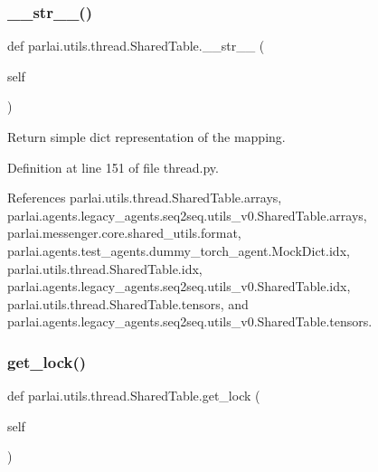 \mbox{\label{classparlai_1_1utils_1_1thread_1_1SharedTable_aa18f723bbdfce0ab50d9c36b20cec2c7}} 
\subsubsection{\texorpdfstring{\+\_\+\+\_\+str\+\_\+\+\_\+()}{\_\_str\_\_()}}
{\footnotesize\ttfamily def parlai.\+utils.\+thread.\+Shared\+Table.\+\_\+\+\_\+str\+\_\+\+\_\+ (\begin{DoxyParamCaption}\item[{}]{self }\end{DoxyParamCaption})}

\begin{DoxyVerb}Return simple dict representation of the mapping.\end{DoxyVerb}
 

Definition at line 151 of file thread.\+py.



References parlai.\+utils.\+thread.\+Shared\+Table.\+arrays, parlai.\+agents.\+legacy\+\_\+agents.\+seq2seq.\+utils\+\_\+v0.\+Shared\+Table.\+arrays, parlai.\+messenger.\+core.\+shared\+\_\+utils.\+format, parlai.\+agents.\+test\+\_\+agents.\+dummy\+\_\+torch\+\_\+agent.\+Mock\+Dict.\+idx, parlai.\+utils.\+thread.\+Shared\+Table.\+idx, parlai.\+agents.\+legacy\+\_\+agents.\+seq2seq.\+utils\+\_\+v0.\+Shared\+Table.\+idx, parlai.\+utils.\+thread.\+Shared\+Table.\+tensors, and parlai.\+agents.\+legacy\+\_\+agents.\+seq2seq.\+utils\+\_\+v0.\+Shared\+Table.\+tensors.

\mbox{\label{classparlai_1_1utils_1_1thread_1_1SharedTable_ab9acef58b28d0c992c841a4cc11a5df2}} 
\subsubsection{\texorpdfstring{get\+\_\+lock()}{get\_lock()}}
{\footnotesize\ttfamily def parlai.\+utils.\+thread.\+Shared\+Table.\+get\+\_\+lock (\begin{DoxyParamCaption}\item[{}]{self }\end{DoxyParamCaption})}

